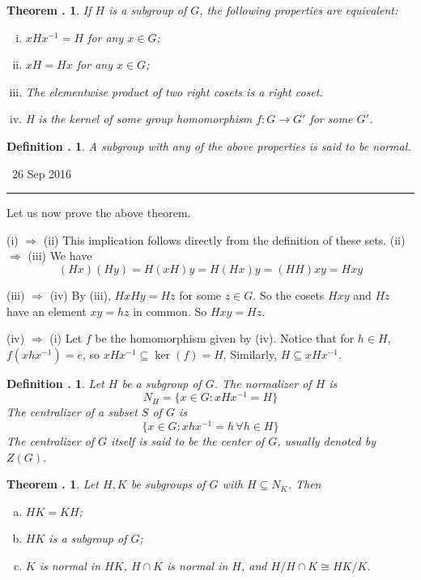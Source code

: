 \documentclass[twoside]{report}
\newcounter{Lecture}
\newcommand{\newLec}[1]{
  \stepcounter{Lecture}
  \noindent{\Large\bf Lecture \arabic{Lecture}} \, #1 \hfill  \rule[1ex]{2.5in}{.1pt} \vspace{1em}
}
\theoremstyle{myts}
\newcounter{c}[Lecture]
\newtheorem{dfn}[c]{Definition \arabic{Lecture}.}
\newtheorem{thm}[c]{Theorem \arabic{Lecture}.}
\newcounter{ex}
\newenvironment{prf}{
  \noindent\begin{mdframed}[style=prf]}{\end{mdframed} \vspace{1em}
}
\begin{document}
\begin{thm}
  If $H$ is a subgroup of $G$, the following properties are equivalent:
  \begin{enumerate} [(i)]
    \item $xHx^{-1} = H$ for any $x\in G$;
    \item $xH=Hx$ for any $x\in G$;
    \item The elementwise product of two right cosets is a right coset.
    \item H is the kernel of some group homomorphism $f:G\to G'$ for some $G'$.
  \end{enumerate}
\end{thm}

\begin{dfn}
  A subgroup with any of the above properties is said to be \emph{normal}.
\end{dfn}

\newLec{26 Sep 2016}

\noindent Let us now prove the above theorem.

\begin{prf}
  (i) $\Rightarrow$ (ii) This implication follows directly from the definition of these sets.
  \noindent
  (ii) $\Rightarrow$ (iii) We have
    \[
      (Hx)(Hy) = H(xH)y=H(Hx)y=(HH)xy=Hxy
    \]

  \noindent
  (iii) $\Rightarrow$ (iv) By (iii), $HxHy = Hz$ for some $z\in G$. So the cosets $Hxy$ and $Hz$ have an element $xy = hz$ in common. So $Hxy=Hz$.

  \noindent
  (iv) $\Rightarrow$ (i) Let $f$ be the homomorphism given by (iv). Notice that for $h\in H$, $f(xhx^{-1})=e$, so $xHx^{-1}\subseteq \ker(f) = H$. Similarly, $H\subseteq xHx^{-1}$.
\end{prf}

\begin{dfn}
  Let $H$ be a subgroup of $G$. The \emph{normalizer} of $H$ is
  \[
    N_H = \{ x\in G : xHx^{-1} = H \}
  \]
  The \emph{centralizer} of a subset $S$ of $G$ is
  \[
    \{ x\in G : xhx^{-1} = h\, \forall h\in H \}
  \]
  The centralizer of $G$ itself is said to be the \emph{center} of $G$, usually denoted by $Z(G)$.
\end{dfn}

\begin{thm}
  Let $H,K$ be subgroups of $G$ with $H\subseteq N_K$. Then
  \begin{enumerate}[(a)]
    \item $HK=KH$;
    \item $HK$ is a subgroup of $G$;
    \item $K$ is normal in $HK$, $H\cap K$ is normal in $H$, and $H/H\cap K \cong HK/K$.
  \end{enumerate}
\end{thm}
\end{document}
